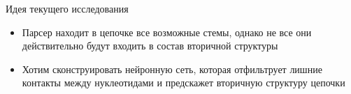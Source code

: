 \documentclass{beamer}
\begin{document}
\begin{frame}{Идея текущего исследования} 
\begin{itemize}
    \item Парсер находит в цепочке все возможные стемы, однако не все они действительно будут входить в состав вторичной структуры
    \item Хотим сконструировать нейронную сеть, которая отфильтрует лишние контакты между нуклеотидами и предскажет вторичную структуру цепочки
\end{itemize}
\vspace{0.5cm}
\end{frame}
\end{document}
